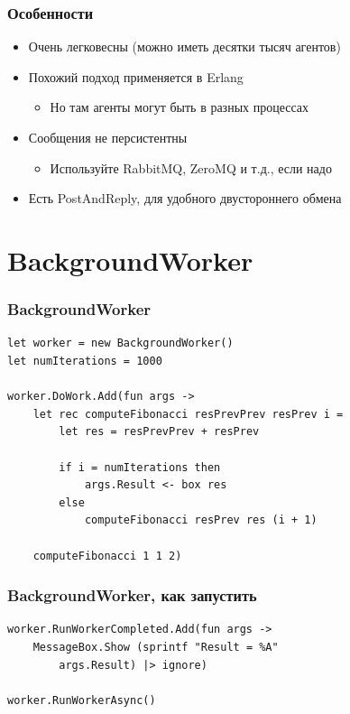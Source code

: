 \documentclass{../../slides-style}
\begin{document}
    \begin{frame}
        \frametitle{Особенности}
        \begin{itemize}
            \item Очень легковесны (можно иметь десятки тысяч агентов)
            \item Похожий подход применяется в Erlang
            \begin{itemize}
                \item Но там агенты могут быть в разных процессах
            \end{itemize}
            \item Сообщения не персистентны
            \begin{itemize}
                \item Используйте RabbitMQ, ZeroMQ и т.д., если надо
            \end{itemize}
            \item Есть PostAndReply, для удобного двустороннего обмена
        \end{itemize}
    \end{frame}

    \section{BackgroundWorker}

    \begin{frame}[fragile]
        \frametitle{BackgroundWorker}
        \begin{verbatim}
let worker = new BackgroundWorker()
let numIterations = 1000

worker.DoWork.Add(fun args ->
    let rec computeFibonacci resPrevPrev resPrev i =
        let res = resPrevPrev + resPrev
        
        if i = numIterations then
            args.Result <- box res
        else
            computeFibonacci resPrev res (i + 1)

    computeFibonacci 1 1 2)
        \end{verbatim}
\end{frame}

    \begin{frame}[fragile]
        \frametitle{BackgroundWorker, как запустить}
        \begin{verbatim}
worker.RunWorkerCompleted.Add(fun args ->
    MessageBox.Show (sprintf "Result = %A" 
        args.Result) |> ignore)

worker.RunWorkerAsync()
        \end{verbatim}
    \end{frame}
\end{document}
